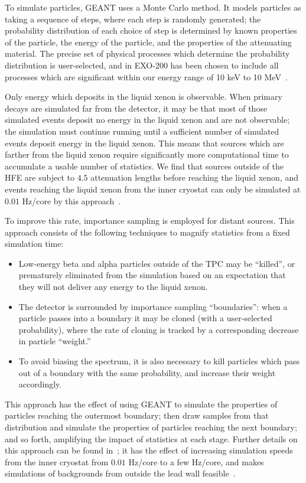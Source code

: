 To simulate particles, GEANT uses a Monte Carlo method.  It models particles as taking a sequence of steps, where each step is randomly generated; the probability distribution of each choice of step is determined by known properties of the particle, the energy of the particle, and the properties of the attenuating material.  The precise set of physical processes which determine the probability distribution is user-selected, and in EXO-200 has been chosen to include all processes which are significant within our energy range of 10 keV to 10 MeV~\cite{MCDocumentRun2a}.

Only energy which deposits in the liquid xenon is observable.  When primary decays are simulated far from the detector, it may be that most of those simulated events deposit no energy in the liquid xenon and are not observable; the simulation must continue running until a sufficient number of simulated events deposit energy in the liquid xenon.  This means that sources which are farther from the liquid xenon require significantly more computational time to accumulate a usable number of statistics.  We find that sources outside of the HFE are subject to $4.5$ attenuation lengths before reaching the liquid xenon, and events reaching the liquid xenon from the inner cryostat can only be simulated at $0.01$ Hz/core by this approach~\cite{MCDocumentRun2a}.

To improve this rate, importance sampling is employed for distant sources.  This approach consists of the following techniques to magnify statistics from a fixed simulation time:
\begin{itemize}
\item Low-energy beta and alpha particles outside of the TPC may be ``killed'', or prematurely eliminated from the simulation based on an expectation that they will not deliver any energy to the liquid xenon.
\item The detector is surrounded by importance sampling ``boundaries'': when a particle passes into a boundary it may be cloned (with a user-selected probability), where the rate of cloning is tracked by a corresponding decrease in particle ``weight.''
\item To avoid biasing the spectrum, it is also necessary to kill particles which pass out of a boundary with the same probability, and increase their weight accordingly.
\end{itemize}
This approach has the effect of using GEANT to simulate the properties of particles reaching the outermost boundary; then draw samples from that distribution and simulate the properties of particles reaching the next boundary; and so forth, amplifying the impact of statistics at each stage.  Further details on this approach can be found in~\cite{Dressel:642987}; it has the effect of increasing simulation speeds from the inner cryostat from $0.01$ Hz/core to a few Hz/core, and makes simulations of backgrounds from outside the lead wall feasible~\cite{MCDocumentRun2a}.

